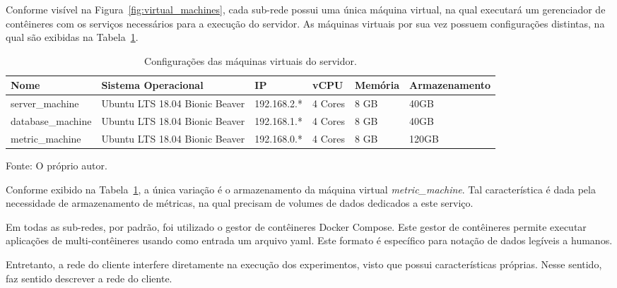Conforme visível na Figura~\ref{fig:virtual_machines}, cada sub-rede possui uma única máquina virtual, na qual executará um gerenciador de contêineres com os serviços necessários para a execução do servidor.
%
As máquinas virtuais por sua vez possuem configurações distintas, na qual são exibidas na Tabela~\ref{tab:configuracao_das_maquinas}.



\begin{table}[htb!]
\centering
\begin{adjustbox}{max width=\textwidth}
\caption{Configurações das máquinas virtuais do servidor.}
\label{tab:configuracao_das_maquinas}
\begin{tabular}{|l|l|l|l|l|l|}
\hline
Nome              & Sistema Operacional            & IP          & vCPU    & Memória & Armazenamento \\ \hline
server\_machine   & Ubuntu LTS 18.04 Bionic Beaver & 192.168.2.* & 4 Cores & 8 GB    & 40GB          \\ \hline
database\_machine & Ubuntu LTS 18.04 Bionic Beaver & 192.168.1.* & 4 Cores & 8 GB    & 40GB          \\ \hline
metric\_machine   & Ubuntu LTS 18.04 Bionic Beaver & 192.168.0.* & 4 Cores & 8 GB    & 120GB         \\ \hline
\end{tabular}
\end{adjustbox}

Fonte: O próprio autor.
\end{table}



Conforme exibido na Tabela~\ref{tab:configuracao_das_maquinas}, a única variação é o armazenamento da máquina virtual \textit{metric\_machine}.
%
Tal característica é dada pela necessidade de armazenamento de métricas, na qual precisam de volumes de dados dedicados a este serviço.



Em todas as sub-redes, por padrão, foi utilizado o gestor de contêineres Docker Compose.
%
Este gestor de contêineres permite executar aplicações de multi-contêineres usando como entrada um arquivo \ac{yaml}.
%
Este formato é específico para notação de dados legíveis a humanos.



Entretanto, a rede do cliente interfere diretamente na execução dos experimentos, visto que possui características próprias.
%
Nesse sentido, faz sentido descrever a rede do cliente.

